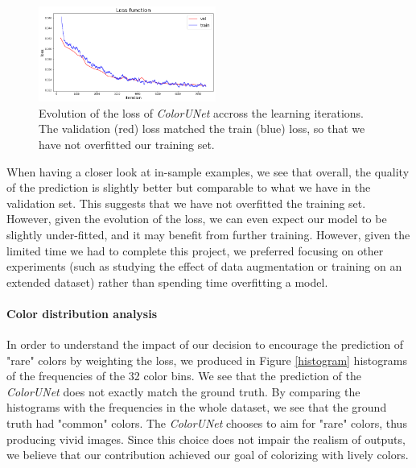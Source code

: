 \documentclass[10pt,twocolumn,letterpaper]{article}
\begin{document}
\begin{figure}
\begin{center}
\includegraphics[width=220px]{lossplot}
\caption{Evolution of the loss of \textit{ColorUNet} accross the learning iterations. The validation (red) loss matched the train (blue) loss, so that we have not overfitted our training set.}
\label{lossplot}
\end{center}
\end{figure}

When having a closer look at in-sample examples, we see that overall, the quality of the prediction is slightly better but comparable to what we have in the validation set. This suggests that we have not overfitted the training set. However, given the evolution of the loss, we can even expect our model to be slightly under-fitted, and it may benefit from further training. However, given the limited time we had to complete this project, we preferred focusing on other experiments (such as studying the effect of data augmentation or training on an extended dataset) rather than spending time overfitting a model.


\paragraph{Color distribution analysis}


In order to understand the impact of our decision to encourage the prediction of "rare" colors by weighting the loss, we produced in Figure \ref{histogram} histograms of the frequencies of the 32 color bins. We see that the prediction of the \textit{ColorUNet} does not exactly match the ground truth. By comparing the histograms with the frequencies in the whole dataset, we see that the ground truth had "common" colors. The \textit{ColorUNet} chooses to aim for "rare" colors, thus producing vivid images. Since this choice does not impair the realism of outputs, we believe that our contribution achieved our goal of colorizing with lively colors.
\end{document}

